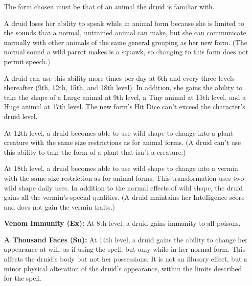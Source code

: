 The form chosen must be that of an animal the druid is familiar with.

A druid loses her ability to speak while in animal form because she is limited to the sounds that a normal, untrained animal can make, but she can communicate normally with other animals of the same general grouping as her new form. (The normal sound a wild parrot makes is a squawk, so changing to this form does not permit speech.)

A druid can use this ability more times per day at 6th and every three levels thereafter (9th, 12th, 15th, and 18th level). In addition, she gains the ability to take the shape of a Large animal at 9th level, a Tiny animal at 13th level, and a Huge animal at 17th level. The new form's Hit Dice can't exceed the character's druid level.

At 12th level, a druid becomes able to use wild shape to change into a plant creature with the same size restrictions as for animal forms. (A druid can't use this ability to take the form of a plant that isn't a creature.)

At 18th level, a druid becomes able to use wild shape to change into a vermin with the same size restriction as for animal forms. This transformation uses two wild shape daily uses. In addition to the normal effects of wild shape, the druid gains all the vermin's special qualities. (A druid maintains her Intelligence score and does not gain the vermin traits.)



\textbf{Venom Immunity (Ex):} At 8th level, a druid gains immunity to all poisons.

\textbf{A Thousand Faces (Su):} At 14th level, a druid gains the ability to change her appearance at will, as if using the  spell, but only while in her normal form. This affects the druid's body but not her possessions. It is not an illusory effect, but a minor physical alteration of the druid's appearance, within the limits described for the spell.

